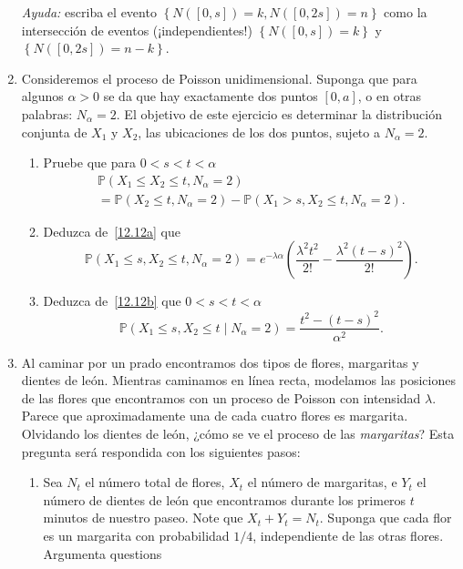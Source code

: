 \begin{enumerate}
         \emph{Ayuda:} escriba el evento $\left\{N\left(\left[0,s\right]\right)=k,N\left(\left[0,2s\right]\right)=n\right\}$ como la intersección de eventos (¡independientes!) $\left\{N\left(\left[0,s\right]\right)=k\right\}$ y $\left\{N\left(\left[0,2s\right]\right)=n-k\right\}$.
       \item Consideremos el proceso de Poisson unidimensional. Suponga que para algunos $\alpha>0$ se da que hay exactamente dos puntos $\left[0,a\right]$, o en otras palabras: $N_\alpha=2$. El objetivo de este ejercicio es determinar la distribución conjunta de $X_1$ y $X_2$, las ubicaciones de los dos puntos, sujeto a $N_\alpha=2$.
         \begin{enumerate}
         \item Pruebe que para $0<s<t<\alpha$\label{12.12a}
           \begin{multline*}
             \mathds{P}\left(X_1\le X_2\le t, N_\alpha=2\right) \\
             =\mathds{P}\left(X_2\le t, N_\alpha=2\right)-\mathds{P}\left(X_1>s,X_2\le t, N_\alpha=2\right).
           \end{multline*}
         \item Deduzca de~\ref{12.12a} que\label{12.12b}
           \begin{equation*}
             \mathds{P}\left(X_1\le s,X_2\le t,N_\alpha=2\right)=e^{-\lambda\alpha}\left(\frac{\lambda^2t^2}{2!}-\frac{\lambda^2{\left(t-s\right)}^2}{2!}\right).
           \end{equation*}
         \item Deduzca de~\ref{12.12b} que $0<s<t<\alpha$
           \begin{equation*}
             \mathds{P}\left(X_1\le s, X_2\le t\mid N_\alpha=2\right)=\frac{t^2-{\left(t-s\right)}^2}{\alpha^2}.
           \end{equation*}
         \end{enumerate}
       \item Al caminar por un prado encontramos dos tipos de flores, margaritas y dientes de león. Mientras caminamos en línea recta, modelamos las posiciones de las flores que encontramos con un proceso de Poisson con intensidad $\lambda$. Parece que aproximadamente una de cada cuatro flores es margarita. Olvidando los dientes de león, ¿cómo se ve el proceso de las \emph{margaritas}? Esta pregunta será respondida con los siguientes pasos:
         \begin{enumerate}
         \item Sea $N_t$ el número total de flores, $X_t$ el número de margaritas, e $Y_t$ el número de dientes de león que encontramos durante los primeros $t$ minutos de nuestro paseo. Note que $X_t+Y_t=N_t$. Suponga que cada flor es un margarita con probabilidad $1/4$, independiente de las otras flores. Argumenta questions\label{12.13a}

\end{enumerate}
\end{enumerate}
